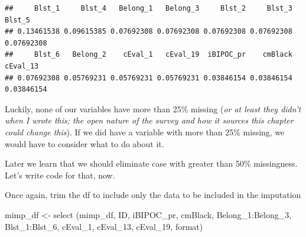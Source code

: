 \documentclass[
  11pt,
]{book}
\newenvironment{Shaded}{\begin{snugshade}}{\end{snugshade}}
\newcommand{\AttributeTok}[1]{\textcolor[rgb]{0.77,0.63,0.00}{#1}}
\newcommand{\CommentTok}[1]{\textcolor[rgb]{0.56,0.35,0.01}{\textit{#1}}}
\newcommand{\DecValTok}[1]{\textcolor[rgb]{0.00,0.00,0.81}{#1}}
\newcommand{\FunctionTok}[1]{\textcolor[rgb]{0.00,0.00,0.00}{#1}}
\newcommand{\NormalTok}[1]{#1}
\newcommand{\OtherTok}[1]{\textcolor[rgb]{0.56,0.35,0.01}{#1}}
\newcommand{\SpecialCharTok}[1]{\textcolor[rgb]{0.00,0.00,0.00}{#1}}
\begin{document}
\begin{verbatim}
##     Blst_1     Blst_4   Belong_1   Belong_3     Blst_2     Blst_3     Blst_5 
## 0.13461538 0.09615385 0.07692308 0.07692308 0.07692308 0.07692308 0.07692308 
##     Blst_6   Belong_2    cEval_1   cEval_19  iBIPOC_pr    cmBlack   cEval_13 
## 0.07692308 0.05769231 0.05769231 0.05769231 0.03846154 0.03846154 0.03846154
\end{verbatim}

Luckily, none of our variables have more than 25\% missing (\emph{or at least they didn't when I wrote this; the open nature of the survey and how it sources this chapter could change this}). If we did have a variable with more than 25\% missing, we would have to consider what to do about it.

Later we learn that we should eliminate case with greater than 50\% missingness. Let's write code for that, now.

\begin{Shaded}
\end{Shaded}

Once again, trim the df to include only the data to be included in the imputation

\begin{Shaded}
\begin{Highlighting}[]
\NormalTok{mimp\_df }\OtherTok{\textless{}{-}}  \FunctionTok{select}\NormalTok{ (mimp\_df, ID, iBIPOC\_pr, cmBlack, Belong\_1}\SpecialCharTok{:}\NormalTok{Belong\_3, Blst\_1}\SpecialCharTok{:}\NormalTok{Blst\_6, cEval\_1, cEval\_13, cEval\_19, format)}
\end{Highlighting}
\end{Shaded}
\end{document}
